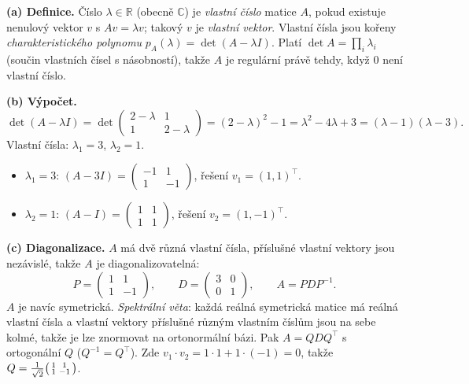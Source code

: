 \begin{reseni}
\textbf{(a) Definice.} Číslo $\lambda\in\mathbb{R}$ (obecně $\mathbb{C}$) je \emph{vlastní číslo} matice $A$, pokud existuje nenulový vektor $v$ s $Av=\lambda v$; takový $v$ je \emph{vlastní vektor}. Vlastní čísla jsou kořeny \emph{charakteristického polynomu} $p_A(\lambda)=\det(A-\lambda I)$. Platí $\det A=\prod_i \lambda_i$ (součin vlastních čísel s násobností), takže $A$ je regulární právě tehdy, když $0$ není vlastní číslo.

\textbf{(b) Výpočet.}
\[
\det(A-\lambda I)=\det\!\begin{pmatrix}2-\lambda & 1\\ 1 & 2-\lambda\end{pmatrix}=(2-\lambda)^2-1=\lambda^2-4\lambda+3=(\lambda-1)(\lambda-3).
\]
Vlastní čísla: $\lambda_1=3$, $\lambda_2=1$.
\begin{itemize}
  \item $\lambda_1=3$: $(A-3I)=\begin{pmatrix}-1&1\\1&-1\end{pmatrix}$, řešení $v_1=(1,1)^{\!\top}$.
  \item $\lambda_2=1$: $(A-I)=\begin{pmatrix}1&1\\1&1\end{pmatrix}$, řešení $v_2=(1,-1)^{\!\top}$.
\end{itemize}

\textbf{(c) Diagonalizace.} $A$ má dvě různá vlastní čísla, příslušné vlastní vektory jsou nezávislé, takže $A$ je diagonalizovatelná:
\[
P=\begin{pmatrix}1&1\\1&-1\end{pmatrix},\qquad D=\begin{pmatrix}3&0\\0&1\end{pmatrix},\qquad A=PDP^{-1}.
\]
$A$ je navíc symetrická. \emph{Spektrální věta}: každá reálná symetrická matice má reálná vlastní čísla a vlastní vektory příslušné různým vlastním číslům jsou na sebe kolmé, takže je lze znormovat na ortonormální bázi. Pak $A=QDQ^{\!\top}$ s ortogonální $Q$ ($Q^{-1}=Q^{\!\top}$). Zde $v_1\cdot v_2=1\cdot1+1\cdot(-1)=0$, takže $Q=\tfrac{1}{\sqrt2}\begin{psmallmatrix}1&1\\1&-1\end{psmallmatrix}$.
\end{reseni}

